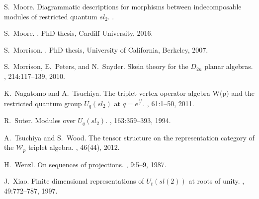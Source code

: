 \documentclass[]{article}
\begin{document}
\begin{thebibliography}{10}
	S.~Moore.
	\newblock Diagrammatic descriptions for morphisms between indecomposable
	modules of restricted quantum $sl_2$.
	.
	
	S.~Moore.
	.
	\newblock PhD thesis, Cardiff University, 2016.
	
	S.~Morrison.
	.
	\newblock PhD thesis, University of California, Berkeley, 2007.
	
	S.~Morrison, E.~Peters, and N.~Snyder.
	\newblock Skein theory for the ${D}_{2n}$ planar algebras.
	, 214:117--139, 2010.
	
	K.~Nagatomo and A.~Tsuchiya.
	\newblock The triplet vertex operator algebra {W}(p) and the restricted quantum
	group $\bar{U}_q(sl_2)$ at $q=e^{\frac{\pi i}{p}}$.
	, 61:1--50, 2011.
	
	R.~Suter.
	\newblock Modules over $ {U}_q(sl_2)$.
	, 163:359--393, 1994.
	
	A.~Tsuchiya and S.~Wood.
	\newblock The tensor structure on the representation category of the
	$\mathcal{W}_p$ triplet algebra.
	, 46(44),
	2012.
	
	H.~Wenzl.
	\newblock On sequences of projections.
	, 9:5--9, 1987.
	
	J.~Xiao.
	\newblock Finite dimensional representations of ${U}_t(sl(2))$ at roots of
	unity.
	, 49:772--787, 1997.
	
\end{thebibliography}


\end{document}
